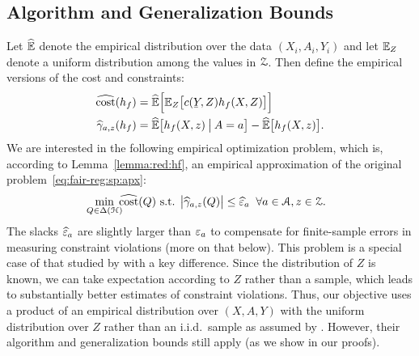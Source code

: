 \documentclass{article}
\begin{document}
\subsection{Algorithm and Generalization Bounds}
\label{sec:algo}

Let $\widehat{\mathbb{E}}$ denote the empirical distribution over the data $(X_i,A_i,Y_i)$ and let $\mathbb{E}_Z$ denote a uniform distribution among the values in $\mathcal{Z}$. Then
define the empirical versions of the cost and constraints:
%
\begin{align}
\label{eq:hcost}
   \hcost(h_f)&=\Ehat\BigBracks{\E_Z\bigBracks{c(\underY,Z)h_f(X,Z)}}
\\
\notag
   \hgamma_{a,z}(h_f)&=\Ehat\bigBracks{h_f(X,z) \bigGiven A=a} - \Ehat\bigBracks{h_f(X,z)}.
\end{align}
%
We are interested in the following empirical optimization problem, which is, according to  Lemma~\ref{lemma:red:hf}, an empirical approximation of the original problem~\eqref{eq:fair-reg:sp:apx}:
%
\begin{align}
\label{eq:prob:sp:empirical}
  \min_{\mathclap{Q\in\Delta(\calH)}}\;\hcost(Q)
\text{ s.t. }
  \bigAbs{\hgamma_{a,z}(Q)}\le\heps_a
\;\;
  \text{$\forall a\in\calA, z\in\calZ$.}
\end{align}
%
The slacks $\widehat{\varepsilon}_a$ are slightly larger than $\varepsilon_a$ to compensate for finite-sample errors in measuring constraint violations (more on that below). This problem is a special case of that studied by \citet{agarwal2018reductions} with a key difference.
Since the distribution of $Z$ is known, we can take expectation according to $Z$ rather than a sample, which leads
to substantially better estimates of constraint violations. Thus,
our objective uses a product of an empirical distribution over $(X,A,Y)$ with the uniform distribution over $Z$ rather than an i.i.d.\ sample as assumed by \citeauthor{agarwal2018reductions}.
However,
their algorithm and generalization bounds
still apply (as we show in our proofs).
\end{document}
